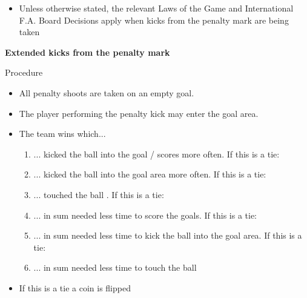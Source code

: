 \begin{itemize}
{      remain on the field of play, outside the penalty area in which the kicks.
      All players, except the player taking the kick and the two goalkeepers,
      must remain within the centre circle)}
\item Unless otherwise stated, the relevant Laws of the Game and International F.A. Board Decisions apply when kicks from the penalty mark are being taken
\end{itemize}


{\bfseries Extended kicks from the penalty mark}

\bigskip

Procedure

\headlinebox

\begin{itemize}
\item All penalty shoots are taken on an empty goal.
\item The player performing the penalty kick may enter the goal area.
\item The team wins which...
\begin{enumerate}
\item ... kicked the ball into the goal / scores more often. If this is a tie:
\item ... kicked the ball into the goal area more often. If this is a tie:
\item ... touched the ball  . If this is a tie:
\item ... in sum needed less time to score the goals. If this is a tie:
\item ... in sum needed less time to kick the ball into the goal area. If this is a tie:
\item ... in sum needed less time to touch the ball
\end{enumerate}
\item If this is a tie a coin is flipped 
\end{itemize}
